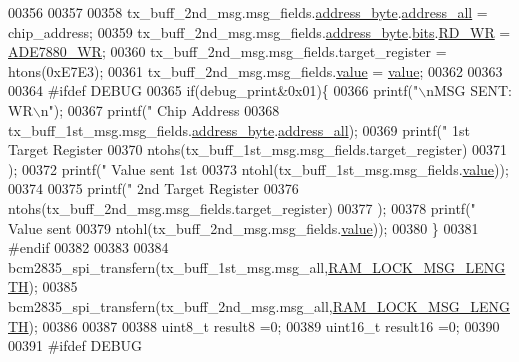 \begin{DoxyCode}
{{{{{{{{{{{{{{00356      
00357      
00358      tx\_buff\_2nd\_msg.msg\_fields.\hyperlink{a00012_af6a65bac733ea3e9b1d24b065163d49a}{address\_byte}.\hyperlink{a00011_a7bf6defa0ae3fb2bca057a3a97d4f740}{address\_all} = chip\_address;
00359      tx\_buff\_2nd\_msg.msg\_fields.\hyperlink{a00012_af6a65bac733ea3e9b1d24b065163d49a}{address\_byte}.\hyperlink{a00011_ae121725fb28cc26495969d71e0e0d42e}{bits}.\hyperlink{a00011_a97e2668c8e5470fa66185f16dc2e8045}{RD\_WR} = 
      \hyperlink{a00041_a36352e0d88dc7c5ede031013c75a678f}{ADE7880\_WR};
00360      tx\_buff\_2nd\_msg.msg\_fields.target\_register = htons(0xE7E3);
00361      tx\_buff\_2nd\_msg.msg\_fields.\hyperlink{a00012_a638e4503e0ae6ce655b7ad2e17e8f0ad}{value} = \hyperlink{a00041_a638e4503e0ae6ce655b7ad2e17e8f0ad}{value};
00362      
00363 
00364 \textcolor{preprocessor}{    #ifdef DEBUG}
00365 \textcolor{preprocessor}{}       \textcolor{keywordflow}{if}(debug\_print&0x01)\{
00366        printf(\textcolor{stringliteral}{"\(\backslash\)nMSG SENT: WR\(\backslash\)n"});
00367        printf(\textcolor{stringliteral}{"       Chip Address %
00368        tx\_buff\_1st\_msg.msg\_fields.\hyperlink{a00012_af6a65bac733ea3e9b1d24b065163d49a}{address\_byte}.\hyperlink{a00011_a7bf6defa0ae3fb2bca057a3a97d4f740}{address\_all});
00369        printf(\textcolor{stringliteral}{"       1st Target Register %
00370        ntohs(tx\_buff\_1st\_msg.msg\_fields.target\_register)
00371        );
00372        printf(\textcolor{stringliteral}{"       Value sent 1st  %
00373        ntohl(tx\_buff\_1st\_msg.msg\_fields.\hyperlink{a00012_a638e4503e0ae6ce655b7ad2e17e8f0ad}{value}));
00374        
00375        printf(\textcolor{stringliteral}{"       2nd Target Register %
00376        ntohs(tx\_buff\_2nd\_msg.msg\_fields.target\_register)
00377        );
00378        printf(\textcolor{stringliteral}{"       Value sent  %
00379        ntohl(tx\_buff\_2nd\_msg.msg\_fields.\hyperlink{a00012_a638e4503e0ae6ce655b7ad2e17e8f0ad}{value}));
00380        \}
00381 \textcolor{preprocessor}{    #endif}
00382 \textcolor{preprocessor}{}
00383     
00384     bcm2835\_spi\_transfern(tx\_buff\_1st\_msg.msg\_all,\hyperlink{a00041_ab38a2f23d72262bab020eb973958f37b}{RAM\_LOCK\_MSG\_LENGTH});
00385     bcm2835\_spi\_transfern(tx\_buff\_2nd\_msg.msg\_all,\hyperlink{a00041_ab38a2f23d72262bab020eb973958f37b}{RAM\_LOCK\_MSG\_LENGTH});
00386 
00387     
00388     uint8\_t  result8  =0;
00389     uint16\_t result16 =0;
00390     
00391 \textcolor{preprocessor}{     #ifdef DEBUG }
}}}}}}}}}}}}}}}}}}}
\end{DoxyCode}
